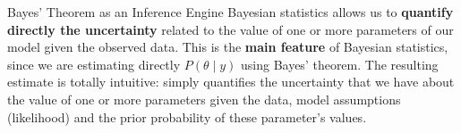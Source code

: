 \begin{frame}{Bayes' Theorem as an Inference Engine}
	Bayesian statistics allows us to \textbf{quantify directly the uncertainty}
	related to the value of one or more parameters of our model given the
	observed data.
	This is the \textbf{main feature} of Bayesian statistics,
	since we are estimating directly $P(\theta \mid y)$ using Bayes' theorem.
	The resulting estimate is totally intuitive:
	simply quantifies the uncertainty that we have about the value of one or more
	parameters given the data, model assumptions (likelihood) and the prior
	probability of these parameter's values.
\end{frame}

